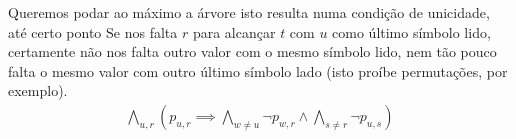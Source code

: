 \documentclass[a4paper,12pt]{article}
\theoremstyle{definition}
\theoremstyle{theorem}
\theoremstyle{remark}
\begin{document}
Queremos podar ao máximo a árvore \label{...}
isto resulta numa condição de unicidade, até certo ponto
Se nos falta $r$ para alcançar $t$ com $u$ como último símbolo lido,
certamente não nos falta outro valor com o mesmo símbolo lido,
nem tão pouco falta o mesmo valor com outro último símbolo lado
(isto proíbe permutações, por exemplo).
\begin{align}
      \bigwedge_{u,r}\left( p_{u,r}
   \implies
      \bigwedge_{w\neq u}\lnot p_{w,r}
         \land
      \bigwedge_{s\neq r}\lnot p_{u,s}
   \right)
\end{align}
\end{document}
